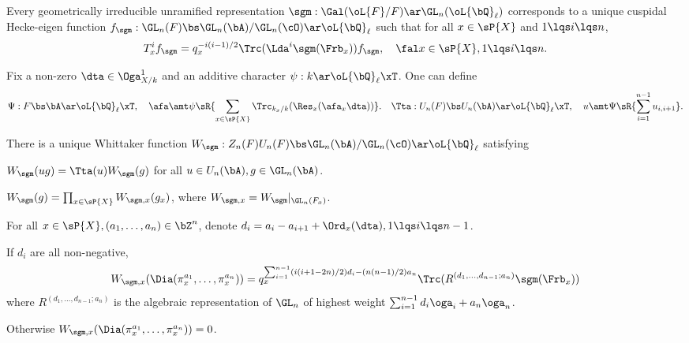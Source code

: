 \documentclass[article, a4paper, twoside]{universal}
\begin{document}
\confighead{}{}{}



\begin{cnj}
	Every geometrically irreducible unramified representation $\sgm:\Gal(\oL{F}/F)\ar\GL_{n}(\oL{\bQ}_{\ell})$
	corresponds to a unique cuspidal Hecke-eigen function $f_{\sgm}:\GL_{n}(F)\bs\GL_{n}(\bA)/\GL_{n}(\cO)\ar\oL{\bQ}_{\ell}$ such that for all $x\in\sP{X}$ and $1\lqs i\lqs n$,
	\[
		T_{x}^{i}f_{\sgm}=q_{x}^{-i(i-1)/2}\Trc(\Lda^{i}\sgm(\Frb_{x}))f_{\sgm},\quad \fal x\in\sP{X}, 1\lqs i\lqs n.
	\]
\end{cnj}

\begin{thm}
	Fix a non-zero $\dta\in\Oga_{X/k}^{1}$ and an additive character $\psi:k\ar\oL{\bQ}_{\ell}\xT$. One can define
	\[
		\Psi:F\bs\bA\ar\oL{\bQ}_{\ell}\xT,\quad \afa\amt\psi\sR{\sum_{x\in\sP{X}}\Trc_{k_{x}/k}(\Res_{x}(\afa_{x}\dta))}.\quad \Tta:U_{n}(F)\bs U_{n}(\bA)\ar\oL{\bQ}_{\ell}\xT,\quad u\amt \Psi\sR{\sum_{i=1}^{n-1}u_{i,i+1}}.
	\]

	There is a unique Whittaker function $W_{\sgm}:Z_{n}(F)U_{n}(F)\bs\GL_{n}(\bA)/\GL_{n}(\cO)\ar\oL{\bQ}_{\ell}$ satisfying
	\begin{itm}
		\item $W_{\sgm}(ug)=\Tta(u)W_{\sgm}(g)$ for all $u\in U_{n}(\bA),g\in\GL_{n}(\bA)$.
		\item $W_{\sgm}(g)=\prod_{x\in\sP{X}}W_{\sgm,x}(g_{x})$, where $W_{\sgm,x}=W_{\sgm}|_{\GL_{n}(F_{x})}$.
		\item For all $x\in\sP{X},(a_{1},\ldots,a_{n})\in\bZ^{n}$, denote $d_{i}=a_{i}-a_{i+1}+\Ord_{x}(\dta), 1\lqs i\lqs n-1$.

		If $d_{i}$ are all non-negative,
		\[
			W_{\sgm,x}(\Dia(\pi_{x}^{a_{1}},\ldots,\pi_{x}^{a_{n}}))=q_{x}^{\sum_{i=1}^{n-1}(i(i+1-2n)/2)d_{i}-(n(n-1)/2)a_{n}}\Trc(R^{(d_{1},\ldots,d_{n-1};a_{n})}\sgm(\Frb_{x}))
		\]
		where $R^{(d_{1},\ldots,d_{n-1};a_{n})}$ is the algebraic representation of $\GL_{n}$ of highest weight $\sum_{i=1}^{n-1}d_{i}\oga_{i}+a_{n}\oga_{n}$.

		Otherwise $W_{\sgm,x}(\Dia(\pi_{x}^{a_{1}},\ldots,\pi_{x}^{a_{n}}))=0$.
	\end{itm}
\end{thm}
\end{document}
